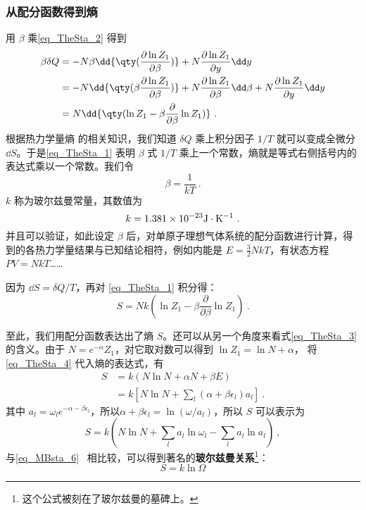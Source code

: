\subsubsection{从配分函数得到熵}
用 $\beta$ 乘\autoref{eq_TheSta_2} 得到
\begin{equation}\label{eq_TheSta_1}
\begin{aligned}
\beta \delta Q&=-N\beta\dd{\qty(\frac{\partial \ln Z_1}{\partial \beta})}+N\frac{\partial \ln Z_1}{\partial y}\dd y\\
&=-N\dd{\qty(\beta\frac{\partial \ln Z_1}{\partial \beta})}+N\frac{\partial \ln Z_1}{\partial \beta}\dd \beta+N\frac{\partial \ln Z_1}{\partial y}\dd y\\
&=N\dd{\qty(\ln Z_1-\beta\frac{\partial }{\partial \beta}\ln Z_1)}~.
\end{aligned}
\end{equation}
根据热力学量熵 的相关知识，我们知道 $\delta Q$ 乘上积分因子 $1/T$ 就可以变成全微分 $\dd S$。于是\autoref{eq_TheSta_1} 表明 $\beta$ 式 $1/T$ 乘上一个常数，熵就是等式右侧括号内的表达式乘以一个常数。我们令
\begin{equation}
\beta=\frac{1}{kT}~.
\end{equation}
$k$ 称为玻尔兹曼常量，其数值为
\begin{equation}
k=1.381\times 10^{-23} \rm{J\cdot K^{-1}}~.
\end{equation}
并且可以验证，如此设定 $\beta$ 后，对单原子理想气体系统的配分函数进行计算，得到的各热力学量结果与已知结论相符，例如内能是 $E=\frac{3}{2}NkT$，有状态方程 $PV=NkT$…… 

因为 $\dd S=\delta Q/T$，再对 \autoref{eq_TheSta_1} 积分得：
\begin{equation}\label{eq_TheSta_3}
S=Nk(\ln Z_1-\beta\frac{\partial }{\partial \beta}\ln Z_1)~.
\end{equation}

至此，我们用配分函数表达出了熵 $S$。还可以从另一个角度来看式\autoref{eq_TheSta_3} 的含义。由于 $N=e^{-\alpha}Z_1$，对它取对数可以得到 $\ln Z_1=\ln N+\alpha$，
将\autoref{eq_TheSta_4} 代入熵的表达式，有
\begin{equation}
\begin{aligned}
S&=k(N\ln N+\alpha N+\beta E)
\\&=k[N\ln N+\sum_l(\alpha+\beta\epsilon_l)a_l]~.
\end{aligned}
\end{equation}
其中 $a_l=\omega_le^{-\alpha-\beta\epsilon_l}$，所以$\alpha+\beta\epsilon_l=\ln(\omega/a_l)$，所以 $S$ 可以表示为
\begin{equation}
S=k(N\ln N+\sum_l a_l\ln\omega_l-\sum_l a_l\ln a_l)~,
\end{equation}
与\autoref{eq_MBsta_6}~ 相比较，可以得到著名的\textbf{玻尔兹曼关系}\footnote{这个公式被刻在了玻尔兹曼的墓碑上。}：
\begin{equation}\label{eq_TheSta_7}
S=k\ln \Omega
\end{equation}
